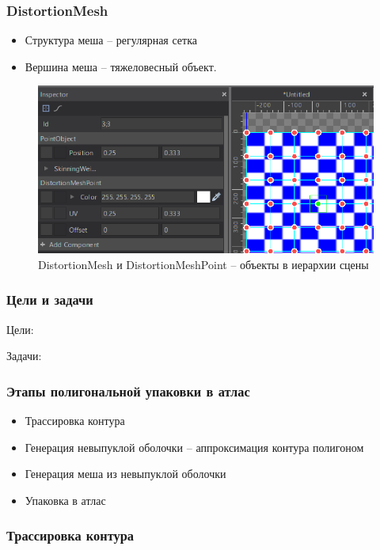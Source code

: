 \documentclass[10pt, unicode]{beamer}
\begin{document}
    \begin{frame}
        \frametitle{DistortionMesh}
        \begin{itemize}
            \item Структура меша -- регулярная сетка
            \item Вершина меша -- тяжеловесный объект.
        \end{itemize}
        \begin{figure}
            \centering
            \includegraphics[scale=0.5]{DistortionMesh.png}
            \caption{DistortionMesh и DistortionMeshPoint -- объекты в иерархии сцены}
        \end{figure}
    \end{frame}
    \begin{frame}
        \frametitle{Цели и задачи}
        Цели:

        Задачи:

    \end{frame}
    \begin{frame}
        \frametitle{Этапы полигональной упаковки в атлас}
        \begin{itemize}
            \item Трассировка контура
            \item Генерация невыпуклой оболочки -- аппроксимация контура полигоном
            \item Генерация меша из невыпуклой оболочки
            \item Упаковка в атлас
        \end{itemize}
    \end{frame}
    \begin{frame}
        \frametitle{Трассировка контура}
    \end{frame}
\end{document}
